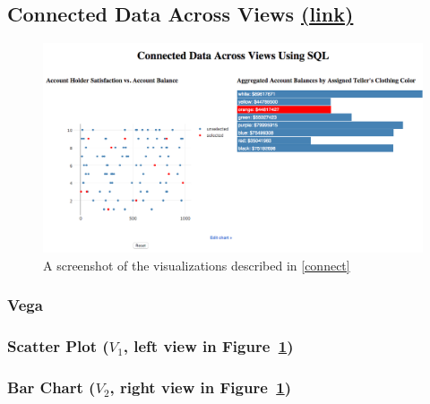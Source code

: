 \documentclass[fleqn,reprint]{sigplanconf}
\begin{document}
\subsection{Connected Data Across Views \href{http://randy.cs.columbia.edu/lineage/pgbench-connect/pgbench.html}{(\underline{link})}}\label{connect}
\begin{figure}[H]
	\includegraphics[width=\columnwidth]{figures/connect}
	\caption{A screenshot of the visualizations described in \autoref{connect}
	}
	\label{fig_connect}
\end{figure}
\subsubsection{Vega}
\subsubsection*{Scatter Plot ($V_1$, left view in Figure~\ref{fig_connect})}

\subsubsection*{Bar Chart ($V_2$, right view in Figure~\ref{fig_connect})}

\end{document}
